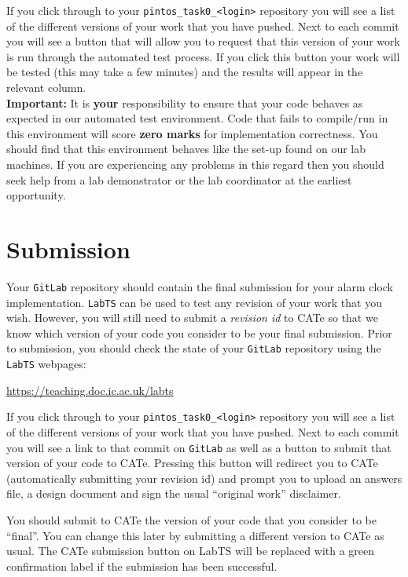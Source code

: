 \documentclass[a4paper,12pt]{article}
\newcommand{\shell}[1]{\lstinline!#1!}
\begin{document}
If you click through to your \shell{pintos_task0_<login>} repository you will see a list of the different versions of your work that you have pushed.
Next to each commit you will see a button that will allow you to request that this version of your work is run through the automated test process.
If you click this button your work will be tested (this may take a few minutes) and the results will appear in the relevant column.\\

{\bf Important:} It is {\bf your} responsibility to ensure that your code behaves as expected in our automated test environment. 
Code that fails to compile/run in this environment will score {\bf zero marks} for implementation correctness.
You should find that this environment behaves like the set-up found on our lab machines.
If you are experiencing any problems in this regard then you should seek help from a lab demonstrator or the lab coordinator at the earliest opportunity.


\section*{Submission}
Your \shell{GitLab} repository should contain the final submission for your alarm clock implementation.
\shell{LabTS} can be used to test any revision of your work that you wish.
However, you will still need to submit a \emph{revision id} to CATe so that we know which version of your code you consider to be your final submission. 
Prior to submission, you should check the state of your \shell{GitLab} repository using the \shell{LabTS} webpages:

\url{https://teaching.doc.ic.ac.uk/labts}

\noindent If you click through to your \shell{pintos_task0_<login>} repository you will see a list of the different versions of your work that you have pushed.
Next to each commit you will see a link to that commit on \shell{GitLab} as well as a button to submit that version of your code to CATe.
Pressing this button will redirect you to CATe (automatically submitting your revision id)
and prompt you to upload an answers file, a design document and sign the usual ``original work'' disclaimer.

You should submit to CATe the version of your code that you consider to be ``final''.
You can change this later by submitting a different version to CATe as usual.
The CATe submission button on LabTS will be replaced with a green confirmation label if the submission has been successful.
\end{document}
